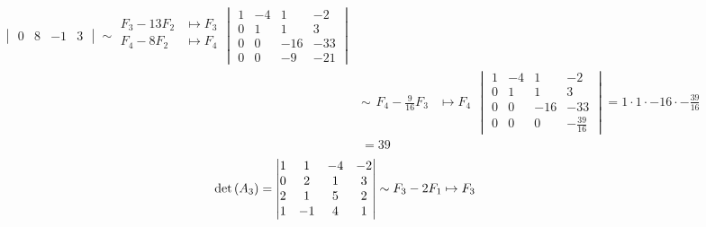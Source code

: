 \begin{enumerate}[label=\listAlph]
\[\begin{aligned}
\begin{vmatrix}
                        0 & 8 & -1 & 3
                    \end{vmatrix}
                    \sim
                    \begin{aligned}
                        F_3 - 13F_2 &\mapsto F_3 \\
                        F_4 - 8F_2 &\mapsto F_4 \\
                    \end{aligned}
                    \begin{vmatrix}
                        1 & -4 & 1 & -2 \\
                        0 & 1 & 1 & 3 \\
                        0 & 0 & -16 & -33 \\
                        0 & 0 & -9 & -21
                    \end{vmatrix}
                    \\
                    &\sim
                    \begin{aligned}
                        F_4 - \frac{9}{16}F_3 &\mapsto F_4
                    \end{aligned}
                    \begin{vmatrix}
                        1 & -4 & 1 & -2 \\
                        0 & 1 & 1 & 3 \\
                        0 & 0 & -16 & -33 \\
                        0 & 0 & 0 & -\frac{39}{16}
                    \end{vmatrix}
                    =
                    1 \cdot 1 \cdot -16 \cdot -\frac{39}{16}
                    \\
                    &= 39
                \end{aligned}
            \]
            \[
                \begin{aligned}
                    \pdet{A_3} 
                    &=
                    \begin{vmatrix}
                        1 & 1 & -4 & -2 \\
                        0 & 2 & 1 & 3 \\
                        2 & 1 & 5 & 2 \\
                        1 & -1 & 4 & 1
                    \end{vmatrix}
                    \sim
                    \begin{aligned}
                        F_3 - 2F_1 &\mapsto F_3 \\

\end{aligned}
\end{aligned}\]
\end{enumerate}
